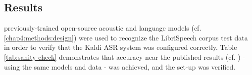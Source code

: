 



\subsection{Results}
\label{chap4:results}

\DIFdelbegin {}\DIFdelend \DIFaddbegin {}\DIFaddend previously-trained open-source acoustic and language models (cf. \DIFaddbegin {}\DIFaddend \ref{chap4:methods:design}) were used to recognize the LibriSpeech corpus test data in order to verify that the Kaldi ASR system was configured correctly.  Table \ref{tab:sanity-check} demonstrates that accuracy near the published results (cf. \cite{panayotov:15}) - using the same models and data - was achieved, and the \DIFdelbegin {}\DIFdelend \DIFaddbegin {}\DIFaddend set-up was verified.

